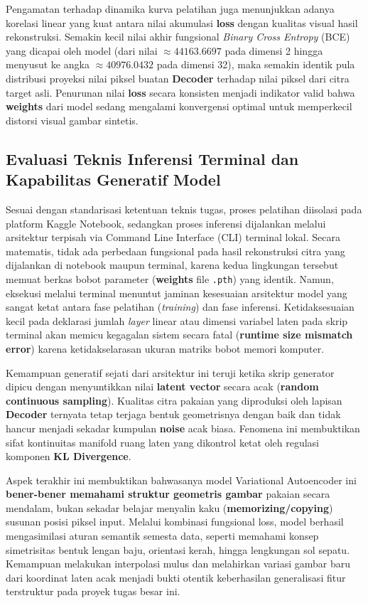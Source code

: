 \documentclass[12pt,titlepage]{article}
\begin{document}
Pengamatan terhadap dinamika kurva pelatihan juga menunjukkan adanya korelasi linear yang kuat antara nilai akumulasi \textbf{loss} dengan kualitas visual hasil rekonstruksi. Semakin kecil nilai akhir fungsional \textit{Binary Cross Entropy} (BCE) yang dicapai oleh model (dari nilai $\approx 44163.6697$ pada dimensi 2 hingga menyusut ke angka $\approx 40976.0432$ pada dimensi 32), maka semakin identik pula distribusi proyeksi nilai piksel buatan \textbf{Decoder} terhadap nilai piksel dari citra target asli. Penurunan nilai \textbf{loss} secara konsisten menjadi indikator valid bahwa \textbf{weights} dari model sedang mengalami konvergensi optimal untuk memperkecil distorsi visual gambar sintetis.

\subsection{Evaluasi Teknis Inferensi Terminal dan Kapabilitas Generatif Model}
Sesuai dengan standarisasi ketentuan teknis tugas, proses pelatihan diisolasi pada platform Kaggle Notebook, sedangkan proses inferensi dijalankan melalui arsitektur terpisah via Command Line Interface (CLI) terminal lokal. Secara matematis, tidak ada perbedaan fungsional pada hasil rekonstruksi citra yang dijalankan di notebook maupun terminal, karena kedua lingkungan tersebut memuat berkas bobot parameter (\textbf{weights} file \lstinline|.pth|) yang identik. Namun, eksekusi melalui terminal menuntut jaminan kesesuaian arsitektur model yang sangat ketat antara fase pelatihan (\textit{training}) dan fase inferensi. Ketidaksesuaian kecil pada deklarasi jumlah \textit{layer} linear atau dimensi variabel laten pada skrip terminal akan memicu kegagalan sistem secara fatal (\textbf{runtime size mismatch error}) karena ketidakselarasan ukuran matriks bobot memori komputer.

Kemampuan generatif sejati dari arsitektur ini teruji ketika skrip generator dipicu dengan menyuntikkan nilai \textbf{latent vector} secara acak (\textbf{random continuous sampling}). Kualitas citra pakaian yang diproduksi oleh lapisan \textbf{Decoder} ternyata tetap terjaga bentuk geometrisnya dengan baik dan tidak hancur menjadi sekadar kumpulan \textbf{noise} acak biasa. Fenomena ini membuktikan sifat kontinuitas manifold ruang laten yang dikontrol ketat oleh regulasi komponen \textbf{KL Divergence}.

Aspek terakhir ini membuktikan bahwasanya model Variational Autoencoder ini \textbf{bener-bener memahami struktur geometris gambar} pakaian secara mendalam, bukan sekadar belajar menyalin kaku (\textbf{memorizing/copying}) susunan posisi piksel input. Melalui kombinasi fungsional loss, model berhasil mengasimilasi aturan semantik semesta data, seperti memahami konsep simetrisitas bentuk lengan baju, orientasi kerah, hingga lengkungan sol sepatu. Kemampuan melakukan interpolasi mulus dan melahirkan variasi gambar baru dari koordinat laten acak menjadi bukti otentik keberhasilan generalisasi fitur terstruktur pada proyek tugas besar ini.
\end{document}
